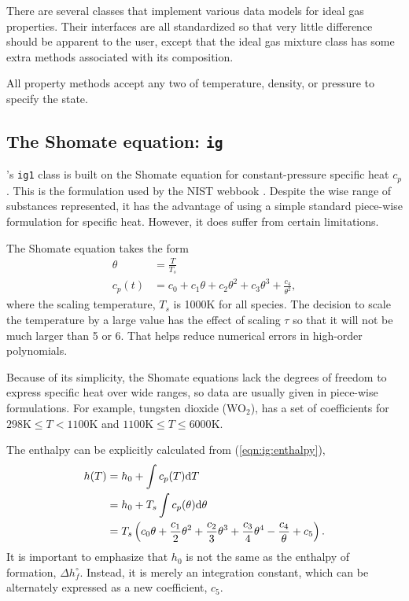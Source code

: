 There are several classes that implement various data models for ideal gas properties.  Their interfaces are all standardized so that very little difference should be apparent to the user, except that the ideal gas mixture class has some extra methods associated with its composition.

All property methods accept any two of temperature, density, or pressure to specify the state.

\subsection{The Shomate equation: \texttt{ig}}\label{sec:ig:ig}

\PM's \texttt{ig1} class is built on the Shomate equation for constant-pressure specific heat $c_p$.  This is the formulation used by the NIST webbook \cite{nist:webbook}.  Despite the wise range of substances represented, it has the advantage of using a simple standard piece-wise formulation for specific heat.  However, it does suffer from certain limitations.

The Shomate equation takes the form
\begin{align}
\theta &= \frac{T}{T_s}\\
c_p(t) &= c_0 + c_1 \theta + c_2 \theta^2 + c_3 \theta^3 + \frac{c_4}{\theta^2},
\end{align}
where the scaling temperature, $T_s$ is 1000K for all species.  The decision to scale the temperature by a large value has the effect of scaling $\tau$ so that it will not be much larger than 5 or 6.  That helps reduce numerical errors in high-order polynomials.

Because of its simplicity, the Shomate equations lack the degrees of freedom to express specific heat over wide ranges, so data are usually given in piece-wise formulations.  For example, tungsten dioxide (WO$_2$), has a set of coefficients for $298\mathrm{K} \le T < 1100\mathrm{K}$ and $1100\mathrm{K} \le T \le 6000\mathrm{K}$.

The enthalpy can be explicitly calculated from (\ref{eqn:ig:enthalpy}),
\begin{align}
h(T) &= h_0 + \int c_p(T) \mathrm{d} T \nonumber\\
 &= h_0 + T_s \int c_p(\theta) \mathrm{d} \theta \nonumber\\
 &= T_s \left(c_0 \theta + \frac{c_1}{2} \theta^2 + \frac{c_2}{3} \theta^3 + \frac{c_3}{4} \theta^4 - \frac{c_4}{\theta} + c_5 \right).
\end{align}
It is important to emphasize that $h_0$ is not the same as the enthalpy of formation, $\Delta h^\circ_f$.  Instead, it is merely an integration constant, which can be alternately expressed as a new coefficient, $c_5$.

